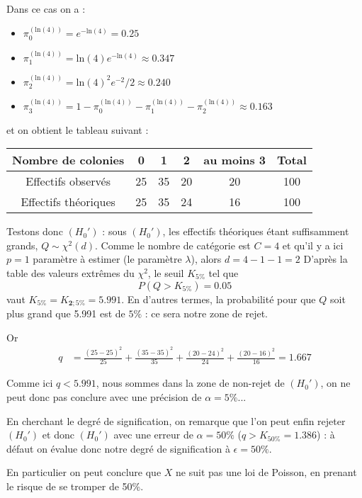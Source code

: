 \documentclass[a4paper,oneside,12pt]{article}
\theoremstyle{plain}
\begin{document}
\begin{enumerate}
    Dans ce cas on a :
    \begin{itemize}
        \item $\pi_0^{\left(\mbox{ln}(4)\right)} = e^{-\mbox{ln}(4)} = 0.25$
        \item $\pi_1^{\left(\mbox{ln}(4)\right)} = \mbox{ln}(4)e^{-\mbox{ln}(4)} \approx 0.347$
        \item $\pi_2^{\left(\mbox{ln}(4)\right)} = \mbox{ln}(4)^2e^{-2}/2  \approx 0.240$
        \item $\pi_3^{\left(\mbox{ln}(4)\right)} = 1 -\pi_0^{\left(\mbox{ln}(4)\right)} -\pi_1^{\left(\mbox{ln}(4)\right)} -\pi_2^{\left(\mbox{ln}(4)\right)} \approx 0.163$
    \end{itemize}

    et on obtient le tableau suivant :

    \begin{table}[h]
    \centering
    \begin{tabular}{|c|c|c|c|c|c|}
        \hline
        Nombre de colonies & 0 & 1 & 2 & au moins 3 & Total \\
        \hline
        Effectifs observés & 25 & 35 & 20 & 20 & 100\\
        \hline
        Effectifs théoriques & 25 & 35 & 24 & 16 & 100 \\
        \hline
    \end{tabular}
    \end{table}

    Testons donc $(H_0')$ : sous $(H_0')$, les effectifs théoriques étant suffisamment grands, $Q \sim \chi^2(d)$. Comme le nombre de catégorie est $C=4$ et qu'il y a ici $p=1$ paramètre à estimer (le paramètre $\lambda$), alors $d = 4- 1- 1 = 2$ D'après la table des valeurs extrêmes du $\chi^2$, le seuil $K_{5\%}$ tel que $$P(Q>K_{5\%}) = 0.05$$ vaut $K_{5\%}=K_{\textbf{2};5\%} =5.991$. En d'autres termes, la probabilité pour que $Q$ soit plus grand que 5.991 est de $5\%$ : ce sera notre zone de rejet.

    Or 
    \begin{align*}
        q &= \frac{(25-25)^2}{25}+\frac{(35-35)^2}{35}+\frac{(20-24)^2}{24}+\frac{(20-16)^2}{16} = 1.667
    \end{align*}


    Comme ici $q<5.991$, nous sommes dans la zone de non-rejet de $(H_0')$, on ne peut donc pas conclure avec une précision de $\alpha = 5\%$...

    En cherchant le degré de signification, on remarque que l'on peut enfin rejeter $(H_{0}')$ et donc $(H_0')$ avec une erreur de $\alpha = 50\%$ ($q>K_{50\%} = 1.386$) : à défaut on évalue donc notre degré de signification à $\epsilon = 50\%$.

    En particulier on peut conclure que $X$ ne suit pas une loi de Poisson, en prenant le risque de se tromper de 50\%.
\end{enumerate}
\end{document}
